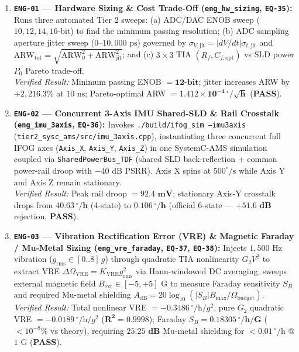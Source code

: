 \documentclass[11pt,a4paper]{article}
\begin{document}
\begin{enumerate}
    \item \textbf{\texttt{ENG-01} --- Hardware Sizing \& Cost Trade-Off (\texttt{eng\_hw\_sizing}, \texttt{EQ-35}):}
    Runs three automated Tier 2 sweeps: (a) ADC/DAC ENOB sweep ($10, 12, 14, 16$-bit) to find the minimum passing resolution; (b) ADC sampling aperture jitter sweep ($0$--$10{,}000\text{ ps}$) governed by $\sigma_{V,\text{jit}} = |dV/dt|\sigma_{t,\text{jit}}$ and $\text{ARW}_{\text{tot}} = \sqrt{\text{ARW}_0^2 + \text{ARW}_{\text{jit}}^2}$; and (c) $3\times 3$ TIA $(R_f, C_{f,\text{opt}})$ vs SLD power $P_0$ Pareto trade-off.\\
    \emph{Verified Result:} Minimum passing ENOB $= \mathbf{12\text{-bit}}$; jitter increases ARW by $+2{,}216.3\%$ at $10\text{ ns}$; Pareto-optimal ARW $= \mathbf{1.412\times 10^{-4}\,^\circ/\sqrt{\text{h}}}$ (\textbf{PASS}).

    \item \textbf{\texttt{ENG-02} --- Concurrent 3-Axis IMU Shared-SLD \& Rail Crosstalk (\texttt{eng\_imu\_3axis}, \texttt{EQ-36}):}
    Invokes \texttt{./build/ifog\_sim --imu3axis} (\texttt{tier2\_sysc\_ams/src/imu\_3axis.cpp}), instantiating three concurrent full IFOG axes (\texttt{Axis\_X}, \texttt{Axis\_Y}, \texttt{Axis\_Z}) in one SystemC-AMS simulation coupled via \texttt{SharedPowerBus\_TDF} (shared SLD back-reflection + common power-rail droop with $-40\text{ dB}$ PSRR). Axis X spins at $500^\circ/\text{s}$ while Axis Y and Axis Z remain stationary.\\
    \emph{Verified Result:} Peak rail droop $= \mathbf{92.4\text{ mV}}$; stationary Axis-Y crosstalk drops from $\mathbf{40.63\,^\circ/\text{h}}$ (4-state) to $\mathbf{0.106\,^\circ/\text{h}}$ (official 6-state --- $\mathbf{+51.6\text{ dB}}$ rejection, \textbf{PASS}).

    \item \textbf{\texttt{ENG-03} --- Vibration Rectification Error (VRE) \& Magnetic Faraday / Mu-Metal Sizing (\texttt{eng\_vre\_faraday}, \texttt{EQ-37}, \texttt{EQ-38}):}
    Injects $1{,}500\text{ Hz}$ vibration ($g_{\text{rms}} \in [0..8]\,g$) through quadratic TIA nonlinearity $G_2 V^2$ to extract VRE $\Delta\Omega_{\text{VRE}} = K_{\text{VRE}} g_{\text{rms}}^2$ via Hann-windowed DC averaging; sweeps external magnetic field $B_{\text{ext}} \in [-5, +5]\text{ G}$ to measure Faraday sensitivity $S_B$ and required Mu-metal shielding $A_{\text{dB}} = 20\log_{10}(|S_B| B_{\max}/\Omega_{\text{budget}})$.\\
    \emph{Verified Result:} Total nonlinear VRE $= -0.3486\,^\circ/\text{h}/g^2$, pure $G_2$ quadratic VRE $= -0.0189\,^\circ/\text{h}/g^2$ ($\mathbf{R^2 = 0.9998}$); Faraday $S_B = \mathbf{0.18305\,^\circ/\text{h/G}}$ ($<10^{-8}\%$ vs theory), requiring $\mathbf{25.25\text{ dB}}$ Mu-metal shielding for $<0.01\,^\circ/\text{h}$ @ $1\text{ G}$ (\textbf{PASS}).


\end{enumerate}
\end{document}
